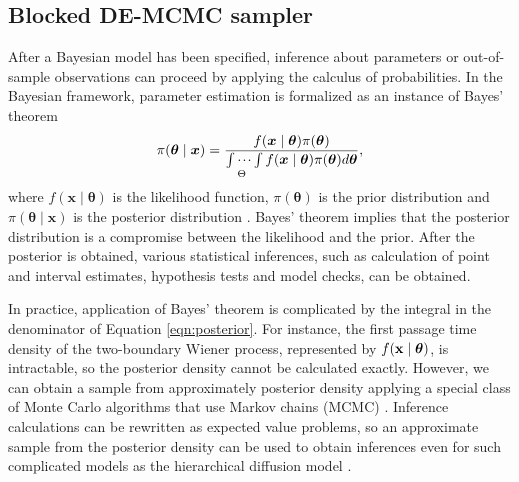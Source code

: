 \documentclass[12pt]{article}
\begin{document}
\subsection{Blocked DE-MCMC sampler}


After a Bayesian model has been specified, inference about
parameters or out-of-sample observations can proceed by applying the calculus of
probabilities. In the Bayesian framework, parameter estimation is
formalized as an instance of  Bayes'
theorem 
% 
\begin{equation} 
\label{eqn:posterior}
\pi(\boldsymbol{\theta} \mid \boldsymbol{x}) = 
   \frac{f(\boldsymbol{x} \mid \boldsymbol{\theta}) \pi(\boldsymbol{\theta})} 
        {\idotsint\limits_\Theta f(\boldsymbol{x} \mid \boldsymbol{\theta})
         \pi(\boldsymbol{\theta})d\boldsymbol{\theta}}, 
\end{equation} 
% 
where $f(\boldsymbol{x} \mid \boldsymbol{\theta})$ is the likelihood
function, $\pi(\boldsymbol{\theta})$ is the prior distribution and
$\pi(\boldsymbol{\theta} \mid \boldsymbol{x})$ is the posterior
distribution \citep{Ber1997,CasBer2002,Ber2011,GelCar2013}. 
Bayes' theorem implies that the posterior distribution is a compromise between the likelihood and the prior. After the
posterior is obtained, various statistical inferences,
such as calculation of point and interval estimates,
hypothesis tests and model checks, can be obtained.

In practice, application of Bayes' theorem is
complicated by the integral in the denominator of
Equation \ref{eqn:posterior}. For instance, the first passage time
density of the two-boundary Wiener process, represented by $f(\bf{x} \mid \boldsymbol{\theta})$, is intractable, so the
posterior density cannot be calculated exactly.  However, we
can obtain a sample from approximately posterior density applying a
special class of Monte Carlo algorithms that use Markov chains (MCMC)
\citep{RobCas2004,GamLop2006,GivHoe2012,GelCar2013}.  Inference calculations can be rewritten as expected value
problems, so an approximate sample from the posterior density can be used to obtain
inferences
even for such complicated
models as the hierarchical diffusion model
\citep{PerVan2002,CraPer2010,VanTue2011}.
\end{document}
